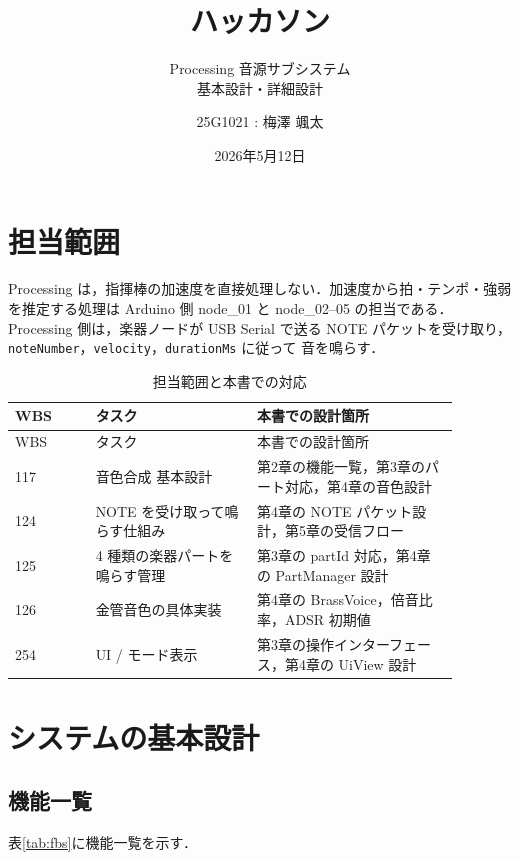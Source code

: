 \documentclass[lualatex,book,openany,paper=a4paper,jafontsize=11.5pt,jafontscale=1.05]{jlreq}
\title{ハッカソン}
\subtitle{Processing 音源サブシステム\\基本設計・詳細設計}
\author{
  25G1021 : 梅澤 颯太
}
\date{2026年5月12日}
\begin{document}
\hypersetup{pageanchor=false}
\maketitle

\setcounter{tocdepth}{2}
\tableofcontents \thispagestyle{empty}

\clearpage
\hypersetup{pageanchor=true}
\chapter{担当範囲}\setcounter{page}{1}


Processing は，指揮棒の加速度を直接処理しない．加速度から拍・テンポ・強弱を推定する処理は
Arduino 側 node\_01 と node\_02--05 の担当である．Processing 側は，楽器ノードが USB Serial で送る
NOTE パケットを受け取り，\texttt{noteNumber}，\texttt{velocity}，\texttt{durationMs} に従って
音を鳴らす．

\begin{longtable}{p{0.16\linewidth}p{0.32\linewidth}p{0.40\linewidth}}
\caption{担当範囲と本書での対応}\label{tab:wbs}\\
\toprule
WBS & タスク & 本書での設計箇所 \\
\midrule
\endfirsthead
\toprule
WBS & タスク & 本書での設計箇所 \\
\midrule
\endhead
117 & 音色合成 基本設計 & 第2章の機能一覧，第3章のパート対応，第4章の音色設計 \\
124 & NOTE を受け取って鳴らす仕組み & 第4章の NOTE パケット設計，第5章の受信フロー \\
125 & 4 種類の楽器パートを鳴らす管理 & 第3章の partId 対応，第4章の PartManager 設計 \\
126 & 金管音色の具体実装 & 第4章の BrassVoice，倍音比率，ADSR 初期値 \\
254 & UI / モード表示 & 第3章の操作インターフェース，第4章の UiView 設計 \\
\bottomrule
\end{longtable}

\chapter{システムの基本設計}

\section{機能一覧}
表\ref{tab:fbs}に機能一覧を示す．
\end{document}
